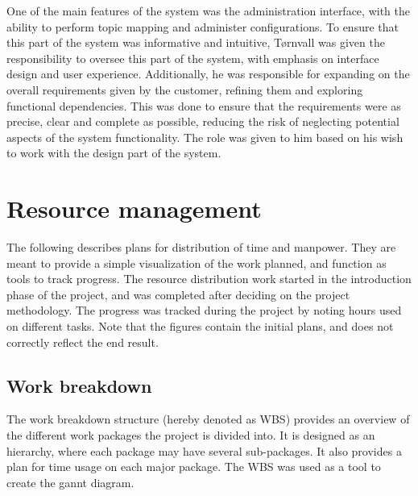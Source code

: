 One of the main features of the system was the administration interface, with the ability to perform topic mapping and administer configurations. To ensure that this part of the system was informative and intuitive, Tørnvall was given the responsibility to oversee this part of the system, with emphasis on interface design and user experience. Additionally, he was responsible for expanding on the overall requirements given by the customer, refining them and exploring functional dependencies. This was done to ensure that the requirements were as precise, clear and complete as possible, reducing the risk of neglecting potential aspects of the system functionality. The role was given to him based on his wish to work with the design part of the system.

\clearpage

\section{Resource management}
\label{sec:process_and_methodology-resource_management}

The following describes plans for distribution of time and manpower. They are meant to provide a simple visualization of the work planned, and function as tools to track progress. The resource distribution work started in the introduction phase of the project, and was completed after deciding on the project methodology. The progress was tracked during the project by noting hours used on different tasks. Note that the figures contain the initial plans, and does not correctly reflect the end result.

\subsection{Work breakdown}
\label{subsec:process_and_methodology-resource_management-work_breakdown}

The work breakdown structure (hereby denoted as WBS) provides an overview of the different work packages the project is divided into. It is designed as an hierarchy, where each package may have several sub-packages. It also provides a plan for time usage on each major package. The WBS was used as a tool to create the gannt diagram.

